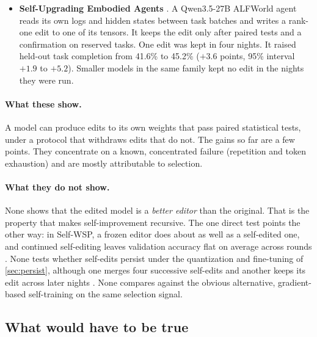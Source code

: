 \begin{itemize}[leftmargin=*,itemsep=3pt]
\item \textbf{Self-Upgrading Embodied Agents} \citep{ax2611_31117}. A Qwen3.5-27B ALFWorld agent reads its own logs and hidden states between task batches and writes a rank-one edit to one of its tensors. It keeps the edit only after paired tests and a confirmation on reserved tasks. One edit was kept in four nights. It raised held-out task completion from 41.6\% to 45.2\% ($+3.6$ points, 95\% interval $+1.9$ to $+5.2$). Smaller models in the same family kept no edit in the nights they were run.
\end{itemize}

\paragraph{What these show.} A model can produce edits to its own weights that pass paired statistical tests, under a protocol that withdraws edits that do not. The gains so far are a few points. They concentrate on a known, concentrated failure (repetition and token exhaustion) and are mostly attributable to selection.

\paragraph{What they do not show.} None shows that the edited model is a \emph{better editor} than the original. That is the property that makes self-improvement recursive. The one direct test points the other way: in Self-WSP, a frozen editor does about as well as a self-edited one, and continued self-editing leaves validation accuracy flat on average across rounds \citep{ax2611_28833}. None tests whether self-edits persist under the quantization and fine-tuning of \cref{sec:persist}, although one merges four successive self-edits \citep{ax2611_29513} and another keeps its edit across later nights \citep{ax2611_31117}. None compares against the obvious alternative, gradient-based self-training on the same selection signal.

\subsection{What would have to be true}


